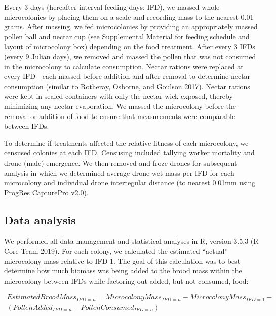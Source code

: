 \documentclass[11pt,]{article}
\begin{document}
Every 3 days (hereafter interval feeding days: IFD), we massed whole
microcolonies by placing them on a scale and recording mass to the
nearest 0.01 grams. After massing, we fed microcolonies by providing an
appropriately massed pollen ball and nectar cup (see Supplemental
Material for feeding schedule and layout of microcolony box) depending
on the food treatment. After every 3 IFDs (every 9 Julian days), we
removed and massed the pollen that was not consumed in the microcolony
to calculate consumption. Nectar rations were replaced at every IFD -
each massed before addition and after removal to determine nectar
consumption (similar to Rotheray, Osborne, and Goulson 2017). Nectar
rations were kept in sealed containers with only the nectar wick
exposed, thereby minimizing any nectar evaporation. We massed the
microcolony before the removal or addition of food to ensure that
measurements were comparable between IFDs.

To determine if treatments affected the relative fitness of each
microcolony, we censused colonies at each IFD. Censusing included
tallying worker mortality and drone (male) emergence. We then removed
and froze drones for subsequent analysis in which we determined average
drone wet mass per IFD for each microcolony and individual drone
intertegular distance (to nearest 0.01mm using ProgRes CapturePro v2.0).

\hypertarget{data-analysis}{%
\subsection{Data analysis}\label{data-analysis}}

We performed all data management and statistical analyses in R, version
3.5.3 (R Core Team 2019). For each colony, we calculated the estimated
``actual'' microcolony mass relative to IFD 1. The goal of this
calculation was to best determine how much biomass was being added to
the brood mass within the microcolony between IFDs while factoring out
added, but not consumed, food:

\[
\begin{aligned}
Estimated Brood Mass_{IFD = n} = Microcolony Mass_{IFD = n} - Microcolony Mass_{IFD = 1} - \\
(Pollen Added_{IFD = n} - Pollen Consumed_{IFD = n})
\end{aligned}
\]
\end{document}
